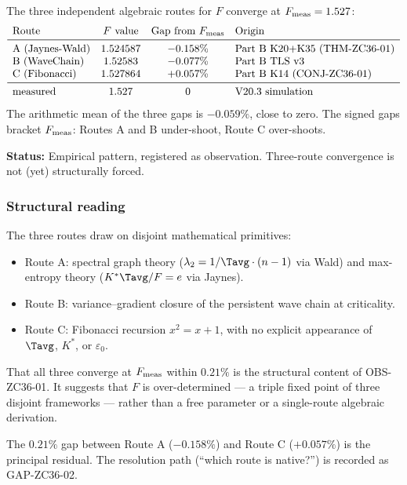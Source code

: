 \documentclass[12pt, a4paper]{article}
\begin{document}
\begin{keybox}[title={OBS-ZC36-01: Three-route Fiedler convergence}]
The three independent algebraic routes for $F$ converge at
$F_{\rm meas} = 1.527$:
\[
\begin{array}{l@{\quad}c@{\quad}c@{\quad}l}
  \text{Route} & F\text{ value} & \text{Gap from } F_{\rm meas} & \text{Origin}\\
  \midrule
  \text{A (Jaynes-Wald)}  & 1.524587 & -0.158\% & \text{Part B K20+K35 (THM-ZC36-01)}\\
  \text{B (WaveChain)}    & 1.52583  & -0.077\% & \text{Part B TLS v3}\\
  \text{C (Fibonacci)}    & 1.527864 & +0.057\% & \text{Part B K14 (CONJ-ZC36-01)}\\
  \midrule
  \text{measured}         & 1.527    & 0        & \text{V20.3 simulation}
\end{array}
\]
The arithmetic mean of the three gaps is $-0.059\%$, close to
zero. The signed gaps bracket $F_{\rm meas}$: Routes A and B
under-shoot, Route C over-shoots.

\textbf{Status:} Empirical pattern, registered as observation.
Three-route convergence is not (yet) structurally forced.
\end{keybox}

\subsubsection{Structural reading}

\begin{derivedbox}[title={Reading: $F$ as triple-attractor}]
The three routes draw on disjoint mathematical primitives:
\begin{itemize}[leftmargin=*, noitemsep]
  \item Route A: spectral graph theory
        ($\lambda_2 = 1/\Tavg \cdot (n-1)$ via Wald) and
        max-entropy theory ($K^*\Tavg/F = e$ via Jaynes).
  \item Route B: variance--gradient closure of the persistent
        wave chain at criticality.
  \item Route C: Fibonacci recursion $x^2 = x+1$, with no
        explicit appearance of $\Tavg$, $K^*$, or $\varepsilon_0$.
\end{itemize}
That all three converge at $F_{\rm meas}$ within $0.21\%$ is
the structural content of OBS-ZC36-01. It suggests that
$F$ is over-determined --- a triple fixed point of three
disjoint frameworks --- rather than a free parameter or a
single-route algebraic derivation.

The $0.21\%$ gap between Route A ($-0.158\%$) and Route C
($+0.057\%$) is the principal residual. The resolution path
(``which route is native?'') is recorded as GAP-ZC36-02.
\end{derivedbox}
\end{document}
